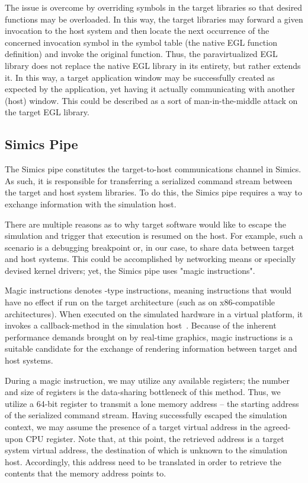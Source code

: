 The issue is overcome by overriding symbols in the target libraries so that desired functions may be overloaded.
In this way, the target libraries may forward a given invocation to the host system and then locate the next occurrence of the concerned invocation symbol in the symbol table (the native EGL function definition) and invoke the original function.
Thus, the paravirtualized EGL library does not replace the native EGL library in its entirety, but rather extends it.
In this way, a target application window may be successfully created as expected by the application, yet having it actually communicating with another (host) window.
This could be described as a sort of man-in-the-middle attack on the target EGL library.

\subsection{Simics Pipe}
\label{sec:proposedsolutionandimplementation_simicspipe}
The Simics pipe constitutes the target-to-host communications channel in Simics.
As such, it is responsible for transferring a serialized command stream between the target and host system libraries.
To do this, the Simics pipe requires a way to exchange information with the simulation host.

There are multiple reasons as to why target software would like to escape the simulation and trigger that execution is resumed on the host.
For example, such a scenario is a debugging breakpoint or, in our case, to share data between target and host systems.
This could be accomplished by networking means or specially devised kernel drivers; yet, the Simics pipe uses "magic instructions".

Magic instructions denotes -type instructions, meaning instructions that would have no effect if run on the target architecture (such as  on x86-compatible architectures).
When executed on the simulated hardware in a virtual platform, it invokes a callback-method in the simulation host~.
Because of the inherent performance demands brought on by real-time graphics, magic instructions is a suitable candidate for the exchange of rendering information between target and host systems.

During a magic instruction, we may utilize any available registers; the number and size of registers is the data-sharing bottleneck of this method.
Thus, we utilize a 64-bit register to transmit a lone memory address -- the starting address of the serialized command stream.
Having successfully escaped the simulation context, we may assume the presence of a target virtual address in the agreed-upon CPU register.
Note that, at this point, the retrieved address is a target system virtual address, the destination of which is unknown to the simulation host.
Accordingly, this address need to be translated in order to retrieve the contents that the memory address points to.


